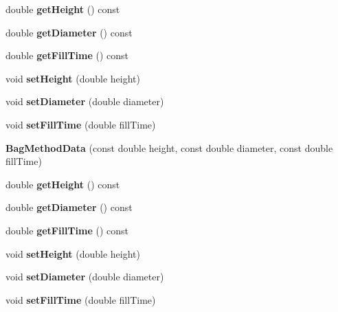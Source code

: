 \begin{DoxyCompactItemize}
\mbox{\label{class_bag_method_data_a1f9c6daa18893692a1203651026c874f}} 
double {\bfseries get\+Height} () const
\item 
\mbox{\label{class_bag_method_data_aac268101eef38828aebdecff0a722fcd}} 
double {\bfseries get\+Diameter} () const
\item 
\mbox{\label{class_bag_method_data_afc8aeaca62ae2a1f3dc7a1651d680d8b}} 
double {\bfseries get\+Fill\+Time} () const
\item 
\mbox{\label{class_bag_method_data_a7ef196332edce80bc4a0e33e09948f6a}} 
void {\bfseries set\+Height} (double height)
\item 
\mbox{\label{class_bag_method_data_aba2d319b9fe44f4ebea5cb01014b5f97}} 
void {\bfseries set\+Diameter} (double diameter)
\item 
\mbox{\label{class_bag_method_data_a43ff2b841656dd33bb358dd79ca3cd80}} 
void {\bfseries set\+Fill\+Time} (double fill\+Time)
\item 
\mbox{\label{class_bag_method_data_a16de9ec7fc35125ba4bac79dce2e30f3}} 
{\bfseries Bag\+Method\+Data} (const double height, const double diameter, const double fill\+Time)
\item 
\mbox{\label{class_bag_method_data_a1f9c6daa18893692a1203651026c874f}} 
double {\bfseries get\+Height} () const
\item 
\mbox{\label{class_bag_method_data_aac268101eef38828aebdecff0a722fcd}} 
double {\bfseries get\+Diameter} () const
\item 
\mbox{\label{class_bag_method_data_afc8aeaca62ae2a1f3dc7a1651d680d8b}} 
double {\bfseries get\+Fill\+Time} () const
\item 
\mbox{\label{class_bag_method_data_a7ef196332edce80bc4a0e33e09948f6a}} 
void {\bfseries set\+Height} (double height)
\item 
\mbox{\label{class_bag_method_data_aba2d319b9fe44f4ebea5cb01014b5f97}} 
void {\bfseries set\+Diameter} (double diameter)
\item 
\mbox{\label{class_bag_method_data_a43ff2b841656dd33bb358dd79ca3cd80}} 
void {\bfseries set\+Fill\+Time} (double fill\+Time)
\end{DoxyCompactItemize}


